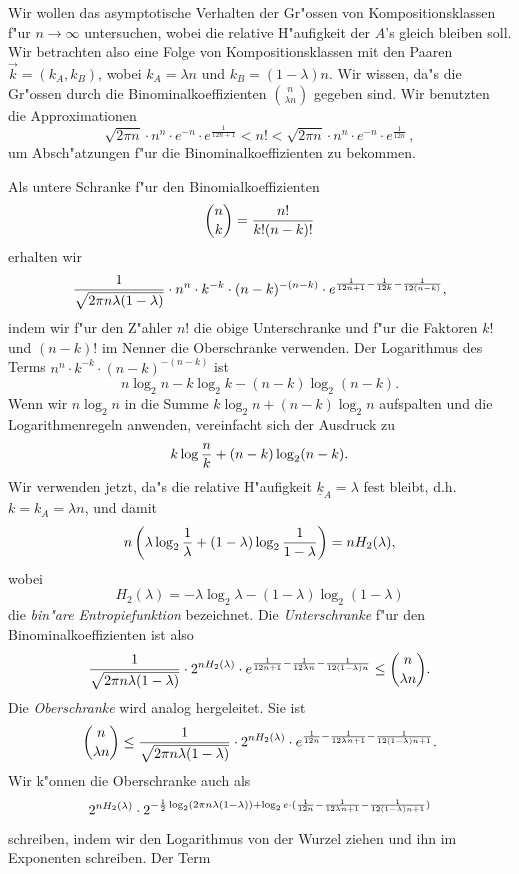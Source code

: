 \documentclass[10pt]{article}
\begin{document}
Wir wollen das asymptotische Verhalten der Gr"ossen von Kompositionsklassen 
f"ur $n\rightarrow\infty$ untersuchen, wobei die relative H"aufigkeit der 
$A$'s gleich bleiben soll. Wir betrachten also eine Folge von 
Kompositionsklassen mit den Paaren $\vec{k}=(k_A,k_B)$, wobei 
$k_A=\lambda n$ und $k_B = (1-\lambda) n$. Wir wissen, da"s die Gr"ossen 
durch die Binominalkoeffizienten ${n\choose \lambda n}$ gegeben sind. Wir
benutzten die Approximationen 
$$
  \sqrt{2\pi n} \cdot n^n \cdot e^{-n} \cdot e^{\frac{1}{12n+1}} < n ! <
  \sqrt{2\pi n} \cdot n^n \cdot e^{-n} \cdot e^{\frac{1}{12n}} \, ,
$$
um Absch"atzungen f"ur die Binominalkoeffizienten zu bekommen.

Als untere Schranke f"ur den Binomialkoeffizienten 
$$ {n \choose k} = {n! \over k! (n-k)!} $$
erhalten wir
$$ {1\over\sqrt{2\pi n \lambda (1-\lambda)}} \cdot
   n^n \cdot k^{-k} \cdot (n-k)^{-(n-k)} \cdot
   e^{{1\over 12n+1} - {1\over 12k} - {1\over 12(n-k)}}, $$
indem wir f"ur den Z"ahler $n!$ die obige Unterschranke und f"ur die Faktoren
$k!$ und $(n-k)!$ im Nenner die Oberschranke verwenden.
Der Logarithmus des Terms $n^n \cdot k^{-k} \cdot (n-k)^{-(n-k)}$ ist
$$ n\log_2 n - k\log_2 k - (n-k)\log_2 (n-k).$$
Wenn wir $n\log_2 n$ in die Summe $k\log_2 n + (n-k)\log_2 n$ aufspalten und
die Logarithmenregeln anwenden, vereinfacht sich der Ausdruck zu
$$ k\log {n\over k} + (n-k)\log_2 (n-k). $$
Wir verwenden jetzt, da"s die relative H"aufigkeit $\underline{k}_A=\lambda$ 
fest bleibt, d.h.
$k=k_A=\lambda n$, und damit
$$ n\left
      (\lambda\log_2{1\over\lambda} + (1-\lambda)\log_2{1\over 1-\lambda}
    \right) =
   n H_2(\lambda), $$
wobei
$$
  H_2(\lambda) = -\lambda \log_2 \lambda - (1-\lambda) \log_2 (1-\lambda)
$$
die \emph{bin"are Entropiefunktion} bezeichnet. Die \emph{Unterschranke} f"ur
den Binominalkoeffizienten ist also
$$
  {1\over\sqrt{2\pi n \lambda (1-\lambda)}} \cdot 
  2^{n H_2(\lambda)} \cdot 
  e^{{1\over 12n+1} - {1\over 12\lambda n} - {1\over 12(1-\lambda)n}}
  \le {n \choose \lambda n}.
$$
Die \emph{Oberschranke} wird analog hergeleitet. Sie ist
$$
  {n \choose \lambda n} \le
  {1\over\sqrt{2\pi n \lambda (1-\lambda)}} \cdot 
  2^{n H_2(\lambda)} \cdot
  e^{{1\over 12n} - {1\over 12\lambda n+1} - {1\over 12(1-\lambda)n+1}}.
$$
Wir k"onnen die Oberschranke auch als
$$
  2^{n H_2(\lambda)} \cdot
  2^{-{1\over 2} \log_2 (2\pi n \lambda (1-\lambda)) +
    \log_2 e \cdot ({1\over 12n} - {1\over 12\lambda n+1} - 
    {1\over 12(1-\lambda)n+1})}
$$
schreiben, indem wir den Logarithmus von der Wurzel ziehen und ihn im 
Exponenten schreiben. Der Term 
\end{document}

